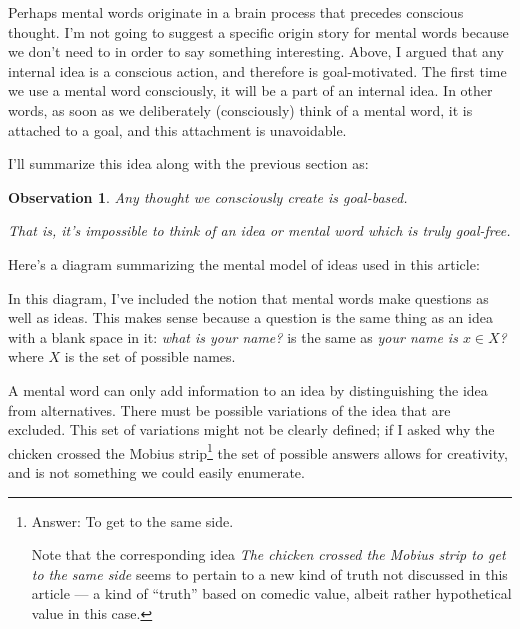 \documentclass[11pt, oneside]{article}   	%
\newtheorem{obs}{Observation}
\begin{document}
Perhaps mental words originate in a brain process that precedes conscious
thought.
I'm not going to suggest a specific origin story for mental words
because we don't need
to in order to say something interesting.
Above, I argued that any internal idea is a conscious action, and therefore is
goal-motivated. The first time we use a mental word consciously, it will be a
part of an internal idea. In other words, as soon as we deliberately
(consciously) think of a mental word, it is attached to a goal, and this
attachment is unavoidable.


I'll summarize this idea along with the previous section as:
\begin{obs}\label{o4}
    Any thought we consciously create is goal-based.

    \medskip

    That is, it's impossible to think of an idea or mental word which is
    truly goal-free.
\end{obs}

Here's a diagram summarizing the mental model of ideas used in this
article:

\begin{center}
%
\end{center}

In this diagram, I've included the notion that mental words make questions as
well as ideas. This makes sense because a question is the same thing as an idea
with a blank space in it: {\em what is your name?} is the same as
{\em your name is $x\in X$?} where $X$ is the set of possible names.

A mental word can only add information to an idea by distinguishing the idea
from alternatives.
There must be possible variations of the idea that are excluded.
This set of variations might not be clearly defined;
if I asked why the chicken crossed the Mobius strip\footnote{Answer: To
get to the same side.\par Note that the corresponding idea {\em The chicken
crossed the Mobius strip to get to the same side} seems to pertain to a new
kind of truth not discussed in this article ---
a kind of ``truth'' based on comedic
value, albeit rather hypothetical value in this case.}
the set of possible answers allows for creativity, and is not something we could
easily enumerate.
\end{document}
